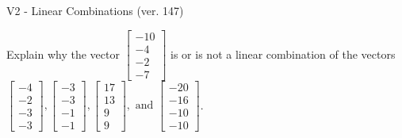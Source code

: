 \begin{exercise}
  \begin{exerciseTitle}V2 - Linear Combinations (ver. 147)\end{exerciseTitle}
  \begin{exerciseStatement}
    Explain why the vector \(\left[\begin{array}{c}
-10 \\
-4 \\
-2 \\
-7
\end{array}\right]\)  is or is not a linear 
	combination of the vectors \(\left[\begin{array}{c}
-4 \\
-2 \\
-3 \\
-3
\end{array}\right] , \left[\begin{array}{c}
-3 \\
-3 \\
-1 \\
-1
\end{array}\right] , \left[\begin{array}{c}
17 \\
13 \\
9 \\
9
\end{array}\right] , \text{ and } \left[\begin{array}{c}
-20 \\
-16 \\
-10 \\
-10
\end{array}\right]\).
	



\end{exerciseStatement}
\end{exercise}
